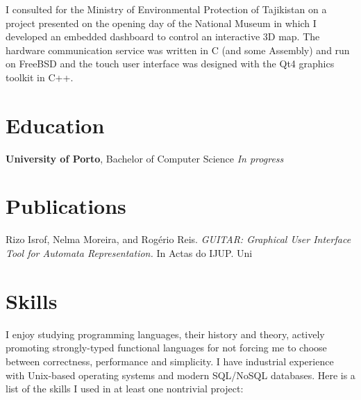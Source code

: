 \documentclass{resume}
\begin{document}
I consulted for the Ministry of Environmental Protection of Tajikistan on a project presented on the opening day of the National Museum in which I developed an embedded dashboard to control an interactive 3D map. The hardware communication service was written in {\sf C} (and some {\sf Assembly}) and run on {\sf FreeBSD} and the touch user interface was designed with the {\sf Qt4} graphics toolkit in {\sf C++}.


\section{\Palatino\bfseries Education}
{{\bfseries University of Porto}, Bachelor of Computer Science} \hfill {\color{gray}\slshape In progress}
\bigskip


\section{\Palatino\bfseries Publications}
Rizo Isrof, Nelma Moreira, and Rogério Reis. {\slshape GUITAR: Graphical User Interface Tool for Automata Representation.} In Actas do IJUP. Uni

\section{\Palatino\bfseries Skills}
I enjoy studying programming languages, their history and theory, actively promoting strongly-typed functional languages for not forcing me to choose between correctness, performance and simplicity. I have industrial experience with Unix-based operating systems and modern SQL/NoSQL databases. Here is a list of the skills I used in at least one nontrivial project:

\bigskip
\end{document}
